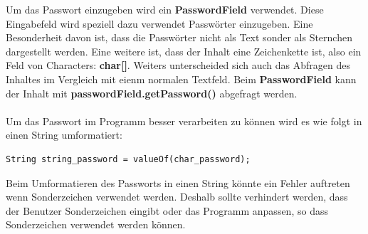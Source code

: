 \vspace{10pt}

Um das Passwort einzugeben wird ein \textbf{PasswordField} verwendet. Diese Eingabefeld wird speziell dazu verwendet Passwörter einzugeben. Eine Besonderheit davon ist, dass die Passwörter nicht als Text sonder als Sternchen dargestellt werden. Eine weitere ist, dass der Inhalt eine Zeichenkette ist, also ein Feld von Characters: \textbf{char[]}. Weiters unterscheided sich auch das Abfragen des Inhaltes im Vergleich mit eienm normalen Textfeld. Beim \textbf{PasswordField} kann der Inhalt mit \textbf{passwordField.getPassword()} abgefragt werden.
\\ \\ Um das Passwort im Programm besser verarbeiten zu können wird es wie folgt in einen String umformatiert:
\begin{lstlisting}[style=Javastyle, caption=char zu String]
	String string_password = valueOf(char_password);
\end{lstlisting}
Beim Umformatieren des Passworts in einen String könnte ein Fehler auftreten wenn Sonderzeichen verwendet werden. Deshalb sollte verhindert werden, dass der Benutzer Sonderzeichen eingibt oder das Programm anpassen, so dass Sonderzeichen verwendet werden können.

\vspace{10pt}


